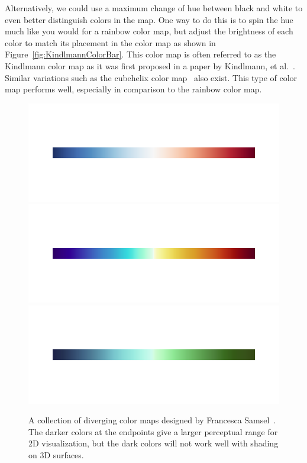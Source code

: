 \documentclass[letterpaper,twocolumn,fleqn]{article}
\newcommand*{\lcite}[1]{~\cite{#1}}
\newcommand*{\scite}[1]{~\cite{#1}}
\newcommand{\etal}{et al.\xspace}
\begin{document}
Alternatively, we could use a maximum change of hue between black and white
to even better distinguish colors in the map. One way to do this is to spin
the hue much like you would for a rainbow color map, but adjust the
brightness of each color to match its placement in the color map as shown
in Figure~\ref{fig:KindlmannColorBar}. This color map is often referred to
as the Kindlmann color map as it was first proposed in a paper by
Kindlmann, \etal\scite{Kindlmann2002}. Similar variations such as the
cubehelix color map\lcite{Green2011} also exist. This type of color map
performs well, especially in comparison to the rainbow color map.

\begin{figure}[htb]
  \centering
  \includegraphics[width=.9\linewidth,trim=0.5in 0.9in 0.5in 0.9in]
                  {ipython/CoolWarmExtended}
  \includegraphics[width=.9\linewidth,trim=0.5in 0.9in 0.5in 0.9in]
                  {ipython/BlueOrangeExtended}
  \includegraphics[width=.9\linewidth,trim=0.5in 0.9in 0.5in 0.9in]
                  {ipython/BlueGreenExtended}
  \caption{A collection of diverging color maps designed by Francesca
    Samsel\lcite{Samsel2015}. The darker colors at the endpoints give a
    larger perceptual range for 2D visualization, but the dark colors will
    not work well with shading on 3D surfaces.}
  \label{fig:ExtendedDiverging}
\end{figure}
\end{document}
